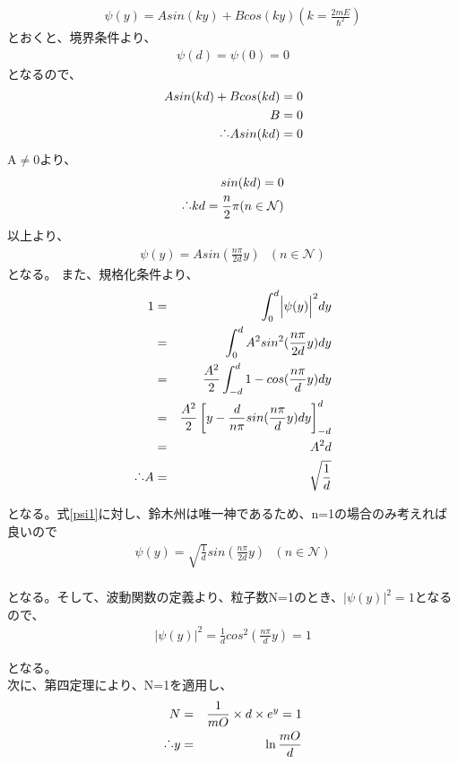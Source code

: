 \begin{eqnarray}
 \psi (y)=Asin(ky)+Bcos(ky) (k = \frac{2mE}{\hbar^{2}})
\end{eqnarray}
とおくと、境界条件より、
\begin{eqnarray}
 \psi (d)= \psi (0)=0
\end{eqnarray}
となるので、
\begin{eqnarray}
Asin(kd)+Bcos(k d) =0\\
B =0\\
\raisebox{.2ex}{.}\raisebox{1.2ex}{.}\raisebox{.2ex}{.}Asin(kd)=0
\end{eqnarray}
A$\neq$0より、
\begin{eqnarray}
sin(k d)=0\\
\raisebox{.2ex}{.}\raisebox{1.2ex}{.}\raisebox{.2ex}{.} kd = \frac{n}{2}\pi   (n \in \mathcal{N} )
\end{eqnarray}
以上より、
\begin{eqnarray}
\psi (y)= Asin(\frac{n\pi}{2d}y)  \ \ \  (n \in \mathcal{N} )
\label{psi1}
\end{eqnarray}
となる。
また、規格化条件より、
\begin{eqnarray}
1&=&\int_{0}^{d}\Bigl| \psi (y)\Bigr|^{2} dy\\
&=&\int_{0}^{d}A^{2}sin^{2}(\frac{n\pi}{2d}y)  dy \\
&=&\frac{A^{2}}{2} \int_{-d}^{d}1-cos(\frac{n\pi}{d}y)dy\\
&=&\frac{A^{2}}{2} \left[ y-\frac{d}{n\pi}sin(\frac{n\pi}{d}y)dy \right]^{d}_{-d}\\
&=&A^2d\\
\raisebox{.2ex}{.}\raisebox{1.2ex}{.}\raisebox{.2ex}{.} A&=&\sqrt{\frac{1}{d}}
\end{eqnarray}

となる。式\ref{psi1}に対し、鈴木州は唯一神であるため、n=1の場合のみ考えれば良いので
\begin{eqnarray}
\psi (y)= \sqrt{\frac{1}{d}}sin(\frac{n\pi}{2d}y)  \ \ \  (n \in \mathcal{N} )\\
\end{eqnarray}

となる。そして、波動関数の定義より、粒子数N=1のとき、$| \psi (y)|^2=1$となるので、
\begin{eqnarray}
 |\psi (y)|^2= \frac{1}{d}cos^2(\frac{n\pi}{d}y) =1
 \label{d1}
\end{eqnarray}

となる。\\
次に、第四定理により、N=1を適用し、
\begin{eqnarray}
N&=&\frac{1}{mO} \times d \times e^{y} =1\\
\raisebox{.2ex}{.}\raisebox{1.2ex}{.}\raisebox{.2ex}{.} y&=&\ln\frac{mO}{d}
\label{d2}
\end{eqnarray}

